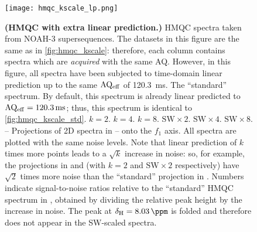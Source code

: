 \begin{figure}
    \centering
    \texttt{[image: hmqc\_kscale\_lp.png]}
    {\label{fig:hmqc_kscale_lp_std}}
    {\label{fig:hmqc_kscale_lp_k2}}
    {\label{fig:hmqc_kscale_lp_k4}}
    {\label{fig:hmqc_kscale_lp_k8}}
    {\label{fig:hmqc_kscale_lp_sw2}}
    {\label{fig:hmqc_kscale_lp_sw4}}
    {\label{fig:hmqc_kscale_lp_sw8}}
    {\label{fig:hmqc_kscale_lp_std_proj}}
    {\label{fig:hmqc_kscale_lp_k2_proj}}
    {\label{fig:hmqc_kscale_lp_k4_proj}}
    {\label{fig:hmqc_kscale_lp_k8_proj}}
    {\label{fig:hmqc_kscale_lp_sw2_proj}}
    {\label{fig:hmqc_kscale_lp_sw4_proj}}
    {\label{fig:hmqc_kscale_lp_sw8_proj}}
    \caption{
        \textbf{(HMQC with extra linear prediction.)}
        \nitrogen{} HMQC spectra taken from NOAH-3  supersequences.
        The datasets in this figure are the same as in \cref{fig:hmqc_kscale}: therefore, each column contains spectra which are \textit{acquired} with the same AQ.
        However, in this figure, all spectra have been subjected to time-domain linear prediction up to the same $\mathrm{AQ_{eff}}$ of \SI{120.3}{\ms}.
        \textbf{} The ``standard'' spectrum.
        By default, this spectrum is already linear predicted to $\aqeff = \SI{120.3}{\ms}$; thus, this spectrum is identical to \cref{fig:hmqc_kscale_std}.
        \textbf{} $k = 2$.
        \textbf{} $k = 4$.
        \textbf{} $k = 8$.
        \textbf{} $\mathrm{SW} \times 2$.
        \textbf{} $\mathrm{SW} \times 4$.
        \textbf{} $\mathrm{SW} \times 8$.
        \textbf{}--\textbf{} Projections of 2D spectra in -- onto the $f_1$ axis.
        All spectra are plotted with the same noise levels.
        Note that linear prediction of $k$ times more points leads to a $\sqrt{k}$ increase in noise: so, for example, the projections in  and  (with $k = 2$ and $\mathrm{SW \times 2}$ respectively) have $\sqrt{2}$ times more noise than the ``standard'' projection in .
        Numbers indicate signal-to-noise ratios relative to the ``standard'' HMQC spectrum in , obtained by dividing the relative peak height by the increase in noise.
        The peak at $\delta_{\ce{H}} = \SI{8.03}{\ppm}$ is folded and therefore does not appear in the SW-scaled spectra.
        \grami{}
    }
    \label{fig:hmqc_kscale_lp}
\end{figure}

